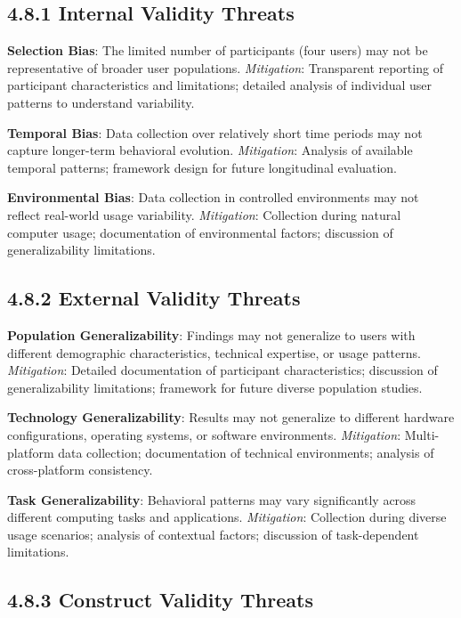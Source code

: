 \documentclass[
  12pt,
  a4paper,
]{report}
\begin{document}
\subsection{4.8.1 Internal Validity
Threats}\label{internal-validity-threats}

\textbf{Selection Bias}: The limited number of participants (four users)
may not be representative of broader user populations.
\emph{Mitigation}: Transparent reporting of participant characteristics
and limitations; detailed analysis of individual user patterns to
understand variability.

\textbf{Temporal Bias}: Data collection over relatively short time
periods may not capture longer-term behavioral evolution.
\emph{Mitigation}: Analysis of available temporal patterns; framework
design for future longitudinal evaluation.

\textbf{Environmental Bias}: Data collection in controlled environments
may not reflect real-world usage variability. \emph{Mitigation}:
Collection during natural computer usage; documentation of environmental
factors; discussion of generalizability limitations.

\subsection{4.8.2 External Validity
Threats}\label{external-validity-threats}

\textbf{Population Generalizability}: Findings may not generalize to
users with different demographic characteristics, technical expertise,
or usage patterns. \emph{Mitigation}: Detailed documentation of
participant characteristics; discussion of generalizability limitations;
framework for future diverse population studies.

\textbf{Technology Generalizability}: Results may not generalize to
different hardware configurations, operating systems, or software
environments. \emph{Mitigation}: Multi-platform data collection;
documentation of technical environments; analysis of cross-platform
consistency.

\textbf{Task Generalizability}: Behavioral patterns may vary
significantly across different computing tasks and applications.
\emph{Mitigation}: Collection during diverse usage scenarios; analysis
of contextual factors; discussion of task-dependent limitations.

\subsection{4.8.3 Construct Validity
Threats}\label{construct-validity-threats}
\end{document}
